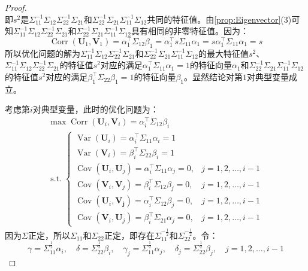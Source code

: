 \begin{proof}
\begin{equation*}
	\end{equation*}
	即$s^2$是$\Sigma_{11}^{-1}\Sigma_{12}\Sigma_{22}^{-1}\Sigma_{21}$和$\Sigma_{22}^{-1}\Sigma_{21}\Sigma_{11}^{-1}\Sigma_{12}$共同的特征值。由\cref{prop:Eigenvector}(3)可知$\Sigma_{11}^{-1}\Sigma_{12}\Sigma_{22}^{-1}\Sigma_{21}$和$\Sigma_{22}^{-1}\Sigma_{21}\Sigma_{11}^{-1}\Sigma_{12}$具有相同的非零特征值。因为：
	\begin{equation*}
		\operatorname{Corr}(\mathbf{U}_1,\mathbf{V}_1)=\alpha_1^{\top}\Sigma_{12}\beta_1=\alpha_1^{\top}s\Sigma_{11}\alpha_1=s\alpha_1^{\top}\Sigma_{11}\alpha_1=s
	\end{equation*}
	所以优化问题的解为$\Sigma_{11}^{-1}\Sigma_{12}\Sigma_{22}^{-1}\Sigma_{21}$和$\Sigma_{22}^{-1}\Sigma_{21}\Sigma_{11}^{-1}\Sigma_{12}$的最大特征值$s^2$、$\Sigma_{11}^{-1}\Sigma_{12}\Sigma_{22}^{-1}\Sigma_{21}$的特征值$s^2$对应的满足$\alpha_1^{\top}\Sigma_{11}\alpha_1=1$的特征向量$\alpha_1$和$\Sigma_{22}^{-1}\Sigma_{21}\Sigma_{11}^{-1}\Sigma_{12}$的特征值$s^2$对应的满足$\beta_1^{\top}\Sigma_{22}\beta_1=1$的特征向量$\beta_1$。显然结论对第$1$对典型变量成立。\par
	考虑第$i$对典型变量，此时的优化问题为：
	\begin{gather*}
		\max\operatorname{Corr}(\mathbf{U}_i,\mathbf{V}_i)=\alpha_i^{\top}\Sigma_{12}\beta_i \\
		\operatorname{s.t.}
		\begin{cases}
			\operatorname{Var}(\mathbf{U}_i)=\alpha_i^{\top}\Sigma_{11}\alpha_i=1 \\
			\operatorname{Var}(\mathbf{V}_i)=\beta_i^{\top}\Sigma_{22}\beta_i=1 \\
			\operatorname{Cov}(\mathbf{U}_i,\mathbf{U}_j)=\alpha_i^{\top}\Sigma_{11}\alpha_j=0,&j=1,2,\dots,i-1 \\
			\operatorname{Cov}(\mathbf{V}_i,\mathbf{V}_j)=\beta_i^{\top}\Sigma_{12}\beta_j=0,&j=1,2,\dots,i-1 \\
			\operatorname{Cov}(\mathbf{U}_i,\mathbf{V_j})=\alpha_i^{\top}\Sigma_{12}\beta_j=0,&j=1,2,\dots,i-1 \\
			\operatorname{Cov}(\mathbf{V}_i,\mathbf{U}_j)=\beta_i^{\top}\Sigma_{21}\alpha_j=0,&j=1,2,\dots,i-1
		\end{cases}
	\end{gather*}
	因为$\Sigma$正定，所以$\Sigma_{11}$和$\Sigma_{22}$正定，即存在$\Sigma_{11}^{-\frac{1}{2}}$和$\Sigma_{22}^{-\frac{1}{2}}$。令：
	\begin{equation*}
		\gamma=\Sigma_{11}^{\frac{1}{2}}\alpha_i,\quad\delta=\Sigma_{22}^{\frac{1}{2}}\beta_i,\quad\gamma_j=\Sigma_{11}^{\frac{1}{2}}\alpha_j,\quad\delta_j=\Sigma_{22}^{\frac{1}{2}}\beta_j,\quad j=1,2,\dots,i-1

\end{equation*}
\end{proof}
